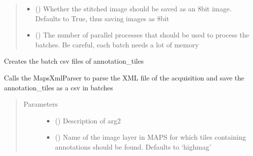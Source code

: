 \documentclass[letterpaper,10pt,english]{sphinxmanual}
\begin{document}
\begin{fulllineitems}
\begin{fulllineitems}
\begin{quote}
\begin{description}
\begin{itemize}
\item {} 
 () \textendash{} Whether the stitched image should be saved as an 8bit image. Defaults to True, thus saving
images as 8bit

\item {} 
 () \textendash{} The number of parallel processes that should be used to process the batches.
Be careful, each batch needs a lot of memory

\end{itemize}

\end{description}\end{quote}

\end{fulllineitems}


\begin{fulllineitems}
\label{\detokenize{index:stitch_MAPS_annotations.Stitcher.parse_create_csv_batches}}
Creates the batch csv files of annotation\_tiles

Calls the MapsXmlParser to parse the XML file of the acquisition and save the annotation\_tiles as a csv in
batches
\begin{quote}\begin{description}
\item[{Parameters}] \leavevmode\begin{itemize}
\item {} 
 () \textendash{} Description of arg2

\item {} 
 () \textendash{} Name of the image layer in MAPS for which tiles containing annotations should
be found. Defaults to ‘highmag’

\end{itemize}


\end{description}
\end{quote}
\end{fulllineitems}
\end{fulllineitems}
\end{document}
